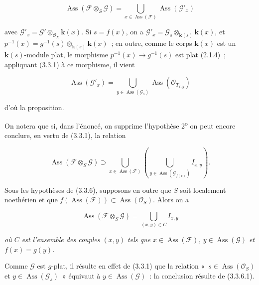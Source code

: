 \begin{env}[3.3.6.2]
\label{IV.2.3.3.6.2-fr}
\[
\operatorname{Ass}(\mathcal F\otimes_S\mathcal G)
=\bigcup_{x\in\operatorname{Ass}(\mathcal F)}
\operatorname{Ass}(\mathcal G'_x)
\]
\end{env}

avec $\mathcal G'_x=\mathcal G'\otimes_{\mathcal O_X}\boldsymbol{k}(x)$. Si $s=f(x)$, on a
$\mathcal G'_x=\mathcal G_s\otimes_{\mathbf{k}(s)}\boldsymbol{k}(x)$, et
$p^{-1}(x)=g^{-1}(s)\otimes_{\mathbf{k}(s)}\boldsymbol{k}(x)$~; en outre, comme le corps $\boldsymbol{k}(x)$ est
un $\boldsymbol{k}(s)$-module plat, le morphisme
$p^{-1}(x)\to g^{-1}(s)$ est plat (2.1.4)~; appliquant (3.3.1) à ce morphisme,
il vient

\begin{env}[3.3.6.3]
\label{IV.2.3.3.6.3-fr}
\[
\operatorname{Ass}(\mathcal G'_x)
=\bigcup_{y\in\operatorname{Ass}(\mathcal G_s)}
\operatorname{Ass}(\mathcal O_{T_{x,y}})
\]
\end{env}

d'où la proposition.

On notera que si, dans l'énoncé, on supprime l'hypothèse
2\textsuperscript{o} on peut encore conclure, en vertu de (3.3.1), la relation

\begin{env}[3.3.6.4]
\label{IV.2.3.3.6.4-fr}
\[
\operatorname{Ass}(\mathcal F\otimes_S\mathcal G)
\supset\bigcup_{x\in\operatorname{Ass}(\mathcal F)}
\left(\bigcup_{y\in\operatorname{Ass}(\mathcal G_{f(x)})}I_{x,y}\right).
\]
\end{env}

\begin{corollary}[3.3.7]
\label{IV.2.3.3.7-fr}
Sous les hypothèses de \textup{(3.3.6)}, supposons en outre que $S$ soit localement
noethérien et que
$f(\operatorname{Ass}(\mathcal F))\subset\operatorname{Ass}(\mathcal O_S)$.
Alors on a
\end{corollary}

\begin{env}[3.3.7.1]
\label{IV.2.3.3.7.1-fr}
\[
\operatorname{Ass}(\mathcal F\otimes_S\mathcal G)
=\bigcup_{(x,y)\in C}I_{x,y}
\]
\end{env}

\textit{où $C$ est l'ensemble des couples $(x,y)$ tels que
$x\in\operatorname{Ass}(\mathcal F)$, $y\in\operatorname{Ass}(\mathcal G)$ et
$f(x)=g(y)$.}

Comme $\mathcal G$ est $g$-plat, il résulte en effet de (3.3.1) que la relation
«~$s\in\operatorname{Ass}(\mathcal O_S)$ et
$y\in\operatorname{Ass}(\mathcal G_s)$~» équivaut à
$y\in\operatorname{Ass}(\mathcal G)$~: la conclusion résulte de (3.3.6.1).

